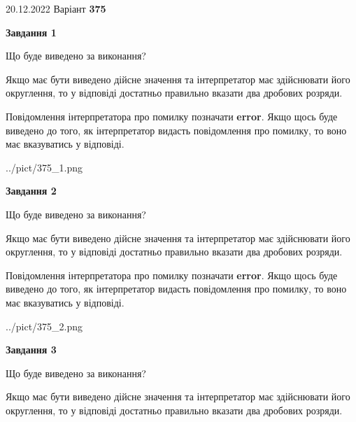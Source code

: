 \documentclass[12pt, ukrainian]{article}
\begin{document}
{20.12.2022 Варіант \No \textbf { 375 }\par}
{
\begin {Large}

{\begin {center}\textbf{Завдання 1}\end {center}}\par
Що буде виведено за виконання? \par

Якщо має бути виведено дійсне значення та інтерпретатор має здійснювати його округлення, 
то у відповіді достатньо правильно вказати два дробових розряди.

Повідомлення інтерпретатора про помилку позначати \textbf{error}.
Якщо щось буде виведено до того, як інтерпретатор видасть повідомлення про помилку, 
то воно має вказуватись у відповіді. \par

\begin{center}
	{../pict/375_1.png}
\end{center}
\newpage

{\begin {center}\textbf{Завдання 2}\end {center}}\par
Що буде виведено за виконання? \par

Якщо має бути виведено дійсне значення та інтерпретатор має здійснювати його округлення, 
то у відповіді достатньо правильно вказати два дробових розряди.

Повідомлення інтерпретатора про помилку позначати \textbf{error}.
Якщо щось буде виведено до того, як інтерпретатор видасть повідомлення про помилку, 
то воно має вказуватись у відповіді. \par

\begin{center}
	{../pict/375_2.png}
\end{center}
\newpage

{\begin {center}\textbf{Завдання 3}\end {center}}\par
Що буде виведено за виконання? \par

Якщо має бути виведено дійсне значення та інтерпретатор має здійснювати його округлення, 
то у відповіді достатньо правильно вказати два дробових розряди.


\end{Large}}
\end{document}
